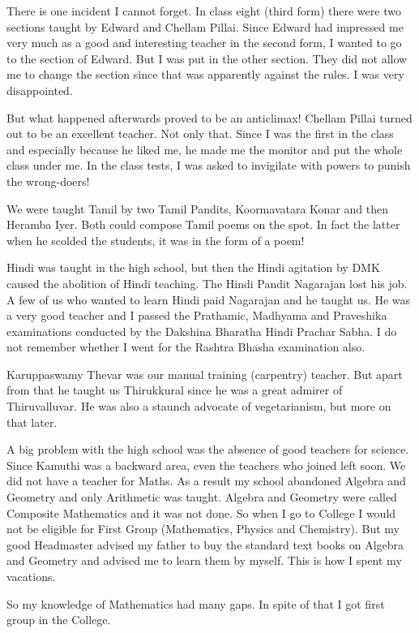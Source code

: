 There is one incident I cannot forget. In class eight (third form) there 
were two sections taught by Edward and Chellam Pillai. Since Edward had 
impressed me very much as a good and interesting teacher in the second 
form, I wanted to go to the section of Edward. But I was put in the 
other section. They did not allow me to change the section since that 
was apparently against the rules. I was very disappointed.

But what happened afterwards proved to be an anticlimax! Chellam Pillai 
turned out to be an excellent teacher. Not only that. Since I was the 
first in the class and especially because he liked me, he made me the 
monitor and put the whole class under me. In the class tests, I was 
asked to invigilate with powers to punish the wrong-doers!

We were taught Tamil by two Tamil Pandits, Koormavatara Konar and then 
Heramba Iyer. Both could compose Tamil poems on the spot. In fact the 
latter when he scolded the students, it was in the form of a poem!

Hindi was taught in the high school, but then the Hindi agitation by DMK 
caused the abolition of Hindi teaching. The Hindi Pandit Nagarajan lost 
his job. A few of us who wanted to learn Hindi paid Nagarajan and he 
taught us. He was a very good teacher and I passed the Prathamic, 
Madhyama and Praveshika examinations conducted by the Dakshina Bharatha 
Hindi Prachar Sabha. I do not remember whether I went for the Rashtra 
Bhasha examination also.

Karuppaswamy Thevar was our manual training (carpentry) teacher. But 
apart from that he taught us Thirukkural since he was a great admirer of 
Thiruvalluvar. He was also a staunch advocate of vegetarianism, but more 
on that later.
 
A big problem with the high school was the absence of good teachers for 
science. Since Kamuthi was a backward area, even the teachers who joined 
left soon. We did not have a teacher for Maths. As a result my school 
abandoned Algebra and Geometry and only Arithmetic was taught. Algebra 
and Geometry were called Composite Mathematics and it was not done. So 
when I go to College I would not be eligible for First Group 
(Mathematics, Physics and Chemistry). But my good Headmaster advised my 
father to buy the standard text books on Algebra and Geometry and 
advised me to learn them by myself. This is how I spent my vacations.

So my knowledge of Mathematics had many gaps. In spite of that I got 
first group in the College.

